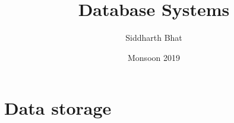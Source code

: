 \documentclass[11pt]{book}
\title{Database Systems}
\author{Siddharth Bhat}
\date{Monsoon 2019}
\begin{document}
\maketitle
\tableofcontents

\chapter{Data storage}
\end{document}
